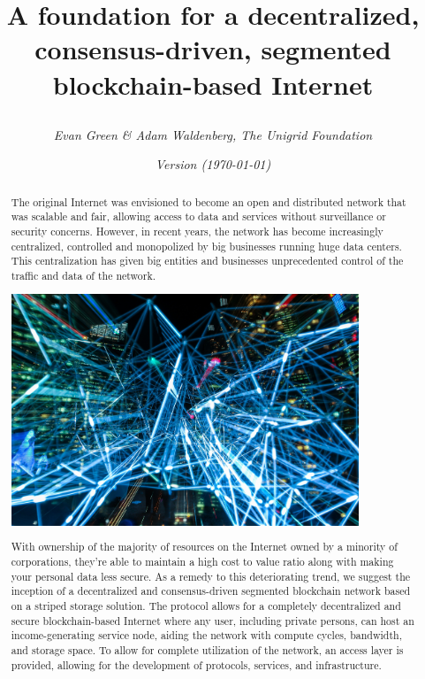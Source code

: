 \documentclass{article}
\author{\emph{Evan Green \& Adam Waldenberg, The Unigrid Foundation}}
\title{
	\makebox[\textwidth]{\hspace{600pt}\tikz \fill[orange] (18,1.4) rectangle (0,0);}
	\vspace{60pt}
	\begin{center}
		
	\end{center}
	\vspace{35pt}
	A foundation for a decentralized, consensus-driven, segmented blockchain-based Internet
	\vspace{10pt}
}
\date{\emph{Version \gitRel\hspace{5pt}(\today)}}
\begin{document}
\setlength{\headheight}{40pt}

\clearpage\maketitle
\thispagestyle{empty}
\newpage
\vspace*{+40pt}
\begin{abstract}
\noindent The original Internet was envisioned to become an open and distributed network that was scalable and fair, allowing access to data and services without surveillance or security concerns. However, in recent years, the network has become increasingly centralized, controlled and monopolized by big businesses running huge data centers. This centralization has given big entities and businesses unprecedented control of the traffic and data of the network.

\begin{mdframed}[style=textimage]
	\includegraphics[width=295pt]{lights}
\end{mdframed}

\noindent With ownership of the majority of resources on the Internet owned by a minority of corporations, they're able to maintain a high cost to value ratio along with making your personal data less secure. As a remedy to this deteriorating trend, we suggest the inception of a decentralized and consensus-driven segmented blockchain network based on a striped storage solution. The protocol allows for a completely decentralized and secure blockchain-based Internet where any user, including private persons, can host an income-generating service node, aiding the network with compute cycles, bandwidth, and storage space. To allow for complete utilization of the network, an access layer is provided, allowing for the development of protocols, services, and infrastructure.

\end{abstract}
\end{document}
